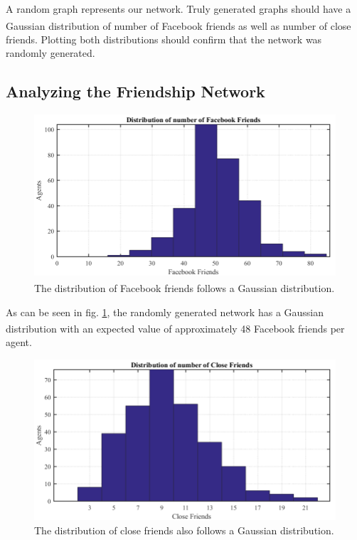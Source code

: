 \documentclass[11pt]{article}
\begin{document}
A random graph represents our network. Truly generated graphs should have a Gaussian distribution of number of Facebook\textsuperscript{\textregistered} friends as well as number of close friends. Plotting both distributions should confirm that the network was randomly generated.

\subsection{Analyzing the Friendship Network}

\begin{figure}
	\centering
	\includegraphics[width=\textwidth]{Graphs/Dist_FB.png}
	\caption{The distribution of Facebook\textsuperscript{\textregistered} friends follows a Gaussian distribution.}
	\label{fig:DistFB}
\end{figure}

As can be seen in fig. \ref{fig:DistFB}, the randomly generated network has a Gaussian distribution with an expected value of approximately 48 Facebook\textsuperscript{\textregistered} friends per agent.

\begin{figure}
	\centering
	\includegraphics[width=\textwidth]{Graphs/Dist_CF.png}
	\caption{The distribution of close friends also follows a Gaussian distribution.}
	\label{fig:DistCF}
\end{figure}
\end{document}
